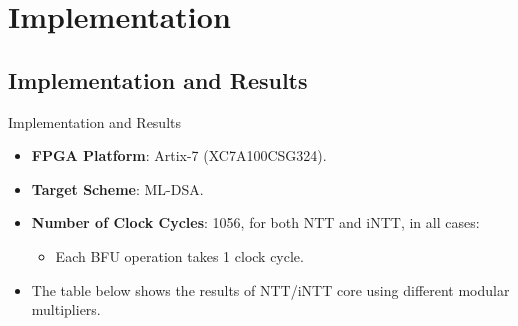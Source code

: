 \documentclass[
	10pt, t,
	hyperref={
		colorlinks,
		citecolor=CtpLatteTeal,
		linkcolor=CtpLatteTeal,
		urlcolor=CtpLatteBlue,
		pdfauthor={Bardia Taghavi},
		pdftitle={LightNTT: A Tiny NTT/iNTT Core for ML-DSA Featuring a Constant-Geometry Pipelined Design},
		pdfsubject={Cryptography},
		pdfkeywords={NTT, iNTT, ML-DSA, Constant-Geometry Pipelined Design},
		pdfcreator={Bardia Taghavi},
		pdfproducer={Bardia Taghavi}
		},
	aspectratio=1610,
	]
	{beamer}
\begin{document}
\section{Implementation}
\subsection{Implementation and Results}
\begin{frame}{Implementation and Results}
	\begin{itemize}\setlength{\itemsep}{1em}
		\item \textbf{FPGA Platform}: Artix-7 (XC7A100CSG324).
		\item \textbf{Target Scheme}: ML-DSA.
		\item \textbf{Number of Clock Cycles}: 1056, for both NTT and iNTT, in all cases:
		\begin{itemize}\setlength{\itemsep}{1ex}\vspace{1ex}
			\item Each BFU operation takes 1 clock cycle.
		\end{itemize}
		\item The table below shows the results of NTT/iNTT core using different modular multipliers.
	\end{itemize}


\end{frame}
\end{document}
